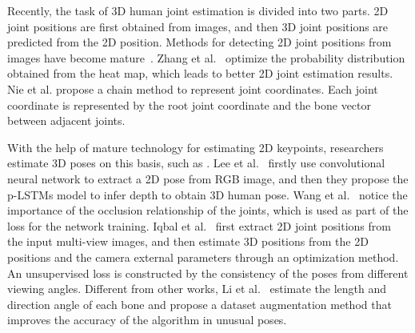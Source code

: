 \documentclass[journal]{IEEEtran}
\begin{document}
Recently, the task of 3D human joint estimation is divided into two parts. 2D joint positions are first obtained from images, and then 3D joint positions are predicted from the 2D position.
Methods for detecting 2D joint positions from images have become mature~\cite{2019Zhang,2019Single}. Zhang et al.~\cite{2019Zhang} optimize the probability distribution obtained from the heat map, which leads to better 2D joint estimation results. Nie et al. \cite{2019Single} propose a chain method to represent joint coordinates. Each joint coordinate is represented by the root joint coordinate and the bone vector between adjacent joints.

With the help of mature technology for estimating 2D keypoints, researchers estimate 3D poses on this basis, such as \cite{wang20203d,2020Weakly,li2020cascaded,20183D,2020Attention,20203DCheng,20203DWu,2019Reweighted,2020Anatomy,2018Propagating}. Lee et al.~\cite{2018Propagating} firstly use convolutional neural network to extract a 2D pose from RGB image, and then they propose the p-LSTMs model to infer depth to obtain 3D human pose.
Wang et al.~\cite{wang20203d} notice the importance of the occlusion relationship of the joints, which is used as part of the loss for the network training. 
Iqbal et al.~\cite{2020Weakly} first extract 2D joint positions from the input multi-view images, and then estimate 3D positions from the 2D positions and the camera external parameters through an optimization method. An unsupervised loss is constructed by the consistency of the poses from different viewing angles. Different from other works, Li et al.~\cite{li2020cascaded} estimate the length and direction angle of each bone and propose a dataset augmentation method that improves the accuracy of the algorithm in unusual poses.
\end{document}
